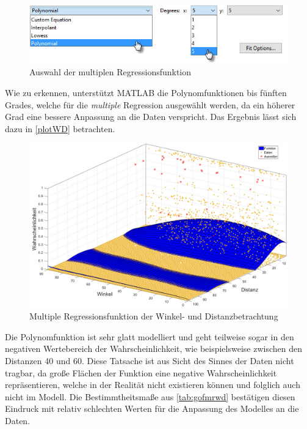 \begin{figure}[H]
\centering
\includegraphics[scale=0.8]{se-wa-jpg/polyWD}
\caption{Auswahl der multiplen Regressionsfunktion}
\label{polyWD}
\end{figure}

Wie zu erkennen, unterstützt MATLAB die Polynomfunktionen bis fünften Grades, welche für die \textit{multiple} Regression ausgewählt werden, da ein höherer Grad eine bessere Anpassung an die Daten verspricht. Das Ergebnis lässt sich dazu in \vref{plotWD} betrachten.

\begin{figure}[H]
\centering
\includegraphics[scale=0.34]{se-wa-jpg/plotWD}
\caption{Multiple Regressionsfunktion der Winkel- und Distanzbetrachtung}
\label{plotWD}
\end{figure}

Die Polynomfunktion ist sehr glatt modelliert und geht teilweise sogar in den negativen Wertebereich der Wahrscheinlichkeit, wie beispielsweise zwischen den Distanzen \textsf{40} und \textsf{60}. Diese Tatsache ist aus Sicht des Sinnes der Daten nicht tragbar, da große Flächen der Funktion eine negative Wahrscheinlichkeit repräsentieren, welche in der Realität nicht existieren können und folglich auch nicht im Modell. Die Bestimmtheitsmaße aus \vref{tab:gofmrwd} bestätigen diesen Eindruck mit relativ schlechten Werten für die Anpassung des Modelles an die Daten.


